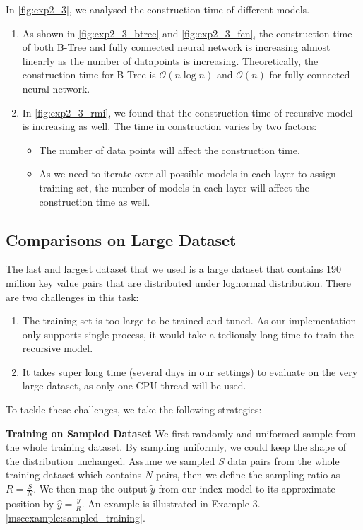 \begin{mscconclusion}
	In \ref{fig:exp2_3}, we analysed the construction time of different models.
	\begin{enumerate}
		\item As shown in \ref{fig:exp2_3_btree} and \ref{fig:exp2_3_fcn}, the construction time of both B-Tree and fully connected neural network is increasing almost linearly as the number of datapoints is increasing. Theoretically, the construction time for B-Tree is $\mathcal{O}(n\log n)$ and $\mathcal{O}(n)$ for fully connected neural network.
		\item In \ref{fig:exp2_3_rmi}, we found that the construction time of recursive model is increasing as well. The time in construction varies by two factors:
			\begin{itemize}
				\item The number of data points will affect the construction time.
				\item As we need to iterate over all possible models in each layer to assign training set, the number of models in each layer will affect the construction time as well.
			\end{itemize}
	\end{enumerate}
\end{mscconclusion}

\subsection{Comparisons on Large Dataset} The last and largest dataset that we used is a large dataset that contains $190$ million key value pairs that are distributed under lognormal distribution. There are two challenges in this task:

\begin{enumerate}
	\item The training set is too large to be trained and tuned. As our implementation only supports single process, it would take a tediously long time to train the recursive model.
	\item It takes super long time (several days in our settings) to evaluate on the very large dataset, as only one CPU thread will be used.
\end{enumerate}

To tackle these challenges, we take the following strategies:

\textbf{Training on Sampled Dataset} We first randomly and uniformed sample from the whole training dataset. By sampling uniformly, we could keep the shape of the distribution unchanged. Assume we sampled $S$ data pairs from the whole training dataset which contains $N$ pairs, then we define the sampling ratio as $R=\frac{S}{N}$. We then map the output $\tilde{y}$ from our index model to its approximate position by $\hat{y}=\frac{\tilde{y}}{R}$. An example is illustrated in Example 3.\ref{mscexample:sampled_training}.

